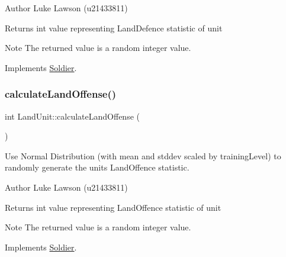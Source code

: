 \begin{DoxyAuthor}{Author}
Luke Lawson (u21433811) 
\end{DoxyAuthor}
\begin{DoxyReturn}{Returns}
int value representing Land\+Defence statistic of unit 
\end{DoxyReturn}
\begin{DoxyNote}{Note}
The returned value is a random integer value. 
\end{DoxyNote}


Implements \mbox{\hyperlink{class_soldier_ab37165b4ce8fbe4a24a759c81ece58c4}{Soldier}}.

\mbox{\label{class_land_unit_a8f95f94a08fbdd268b85160dbd578947}} 
\subsubsection{\texorpdfstring{calculateLandOffense()}{calculateLandOffense()}}
{\footnotesize\ttfamily int Land\+Unit\+::calculate\+Land\+Offense (\begin{DoxyParamCaption}{ }\end{DoxyParamCaption})\hspace{0.3cm}{\ttfamily [virtual]}}



Use Normal Distribution (with mean and stddev scaled by training\+Level) to randomly generate the unit\textquotesingle{}s Land\+Offence statistic. 

\begin{DoxyAuthor}{Author}
Luke Lawson (u21433811) 
\end{DoxyAuthor}
\begin{DoxyReturn}{Returns}
int value representing Land\+Offence statistic of unit 
\end{DoxyReturn}
\begin{DoxyNote}{Note}
The returned value is a random integer value. 
\end{DoxyNote}


Implements \mbox{\hyperlink{class_soldier_ac0add7efb3192adb809bc1746c880fc0}{Soldier}}.

\mbox{\label{class_land_unit_a5a0d88fe84b7700e9e85f6c3c1f1af9d}} 
